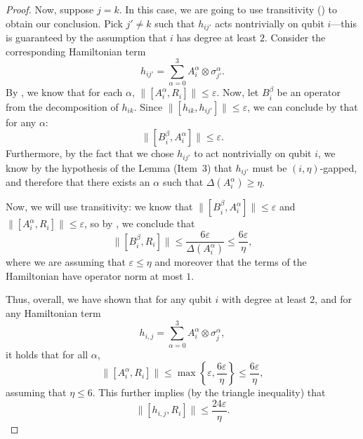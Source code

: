 \documentclass[11pt]{article}
\theoremstyle{plain}
\newcommand{\eps}{\varepsilon}
\newcommand{\IslamNote}[1]{\textcolor{orange}{(Islam: #1)}}
\newcommand{\IslamNote}[1]{}
\begin{document}
\begin{proof}
Now, suppose $j = k$. In this case, we are going to use transitivity () to obtain our conclusion. Pick $j' \neq k$ such that $h_{ij'}$ acts nontrivially on qubit $i$---this is guaranteed by the assumption that $i$ has degree at least $2$. Consider the corresponding Hamiltonian term
\begin{equation}
    h_{ij'} = \sum_{\alpha=0}^3 A_i^\alpha \otimes \sigma_{j'}^\alpha. 
\end{equation}
By , we know that for each $\alpha$, $\| [A_i^\alpha, R_i]\| \leq \eps.$ Now, let $B_i^\beta$ be an operator from the decomposition of $h_{ik}$. Since $\| [h_{ik}, h_{ij'}] \| \leq \eps$, we can conclude by  that for any $\alpha$:
\begin{equation}
    \| [ B_i^\beta, A_i^\alpha] \| \leq \eps.
\end{equation}
Furthermore, by the fact that we chose $h_{ij'}$ to act nontrivially on qubit $i$, we know by the hypothesis of the Lemma (Item~3) that $h_{ij'}$ must be $(i, \eta)$-gapped, and therefore that there exists an $\alpha$ such that $\Delta(A_i^\alpha) \geq \eta$. 

Now, we will use transitivity: we know that $\|[B_i^\beta, A_i^\alpha]\| \leq \eps$ and $\|[A_i^\alpha, R_i]\| \leq \eps$, so by , we conclude that 
\begin{equation}
    \| [B_i^\beta, R_i] \| \leq \frac{6\eps}{\Delta(A_i^\alpha)} \leq \frac{6 \eps}{\eta},
\end{equation}
where we are assuming that $\eps \leq \eta$ and moreover that the terms of the Hamiltonian have operator norm at most $1$. 

Thus, overall, we have shown that for any qubit $i$ with degree at least $2$, and for any Hamiltonian term 
\begin{equation} h_{i,j} = \sum_{\alpha=0}^3 A_i^\alpha \otimes \sigma_j^{\alpha}, \end{equation}
it holds that for all $\alpha$, 
\begin{equation}
    \| [A_i^\alpha, R_i] \| \leq \max \left\{\eps, \frac{6\eps}{\eta} \right\} \leq \frac{6\eps}{\eta}, \label{eq:pivot-commutator}
\end{equation}
assuming that $\eta \leq 6$. This further implies (by the triangle inequality) that
\begin{equation}
    \| [h_{i,j}, R_i] \| \leq \frac{24\eps}{\eta}. \label{eq:pivot-commutator-whole-term}
\end{equation}


\end{proof}
\end{document}
